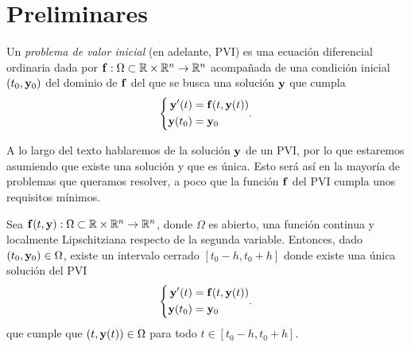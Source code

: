 \section{Preliminares}

\begin{definition}\label{eqn:pvi}
    Un \emph{problema de valor inicial} (en adelante, PVI)
    es una ecuación diferencial ordinaria dada por
    $\vb{f} : \Omega \subset \mathbb{R} \times \mathbb{R}^n \to \mathbb{R}^n$
    acompañada de una condición inicial $(t_0, \vb{y}_0)$ del dominio de $\vb{f}$
    del que se busca una solución $\vb{y}$ que cumpla
    \begin{equation*}
        \left\{
        \begin{aligned}
            \vb{y}'(t) &= \vb{f}(t, \vb{y}(t)) \\
            \vb{y}(t_0) &= \vb{y}_0 \\
        \end{aligned}.
        \right.
    \end{equation*}
\end{definition}


A lo largo del texto hablaremos de la solución $\vb{y}$ de un PVI,
por lo que estaremos asumiendo que existe una solución y que es única.
Esto será así en la mayoría de problemas que queramos resolver,
a poco que la función $\vb{f}$ del PVI cumpla unos requisitos mínimos.

\begin{theorem}
    Sea $\vb{f}(t, \vb{y}) : \Omega \subset \mathbb{R} \times \mathbb{R}^n \to \mathbb{R}^n$,
    donde $\Omega$ es abierto,
    una función continua y
    localmente Lipschitziana respecto de la segunda variable.
    Entonces, dado $(t_0, \vb{y}_0) \in \Omega$,
    existe un intervalo cerrado $[t_0 - h, t_0 + h]$
    donde existe una única solución del PVI
    \begin{equation*}
        \left\{
        \begin{aligned}
            \vb{y}'(t) &= \vb{f}(t, \vb{y}(t)) \\
            \vb{y}(t_0) &= \vb{y}_0 \\
        \end{aligned}.
        \right.
    \end{equation*}
    que cumple que $(t, \vb{y}(t)) \in \Omega$ para todo $t \in [t_0 - h, t_0 + h]$.
\end{theorem}


